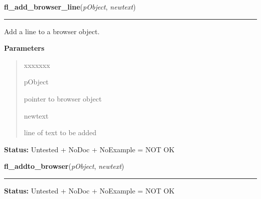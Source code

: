\hspace{.8\funcindent}\begin{boxedminipage}{\funcwidth}

    \raggedright \textbf{fl\_add\_browser\_line}(\textit{pObject}, \textit{newtext})

    \vspace{-1.5ex}

    \rule{\textwidth}{0.5\fboxrule}
\setlength{\parskip}{2ex}
    Add a line to a browser object.

\setlength{\parskip}{1ex}
      \textbf{Parameters}
      \vspace{-1ex}

      \begin{quote}
        \begin{Ventry}{xxxxxxx}

          \item[pObject]

          pointer to browser object

          \item[newtext]

          line of text to be added

        \end{Ventry}

      \end{quote}

\textbf{Status:} Untested + NoDoc + NoExample = NOT OK



    \end{boxedminipage}

    \label{xformslib:library:fl_addto_browser}

    \vspace{0.5ex}

\hspace{.8\funcindent}\begin{boxedminipage}{\funcwidth}

    \raggedright \textbf{fl\_addto\_browser}(\textit{pObject}, \textit{newtext})

    \vspace{-1.5ex}

    \rule{\textwidth}{0.5\fboxrule}
\setlength{\parskip}{2ex}
\setlength{\parskip}{1ex}
\textbf{Status:} Untested + NoDoc + NoExample = NOT OK



    \end{boxedminipage}

